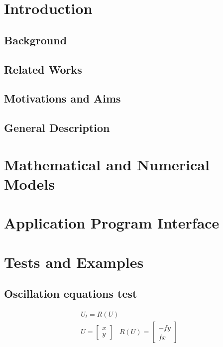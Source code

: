 \documentclass[pdftex,preprint,3p,times,numbers]{elsarticle}
\begin{document}
\section{Introduction}\label{sec:introduction}
\subsection{Background}

\subsection{Related Works}

\subsection{Motivations and Aims}

\subsection{General Description}

\section{Mathematical and Numerical Models}\label{sec:MNmodels}

\section{Application Program Interface}\label{sec:API}

\section{Tests and Examples}\label{sec:Tests}

\clearpage

\subsection{Oscillation equations test}

\begin{equation}
\begin{matrix}
U_t = R(U)  \\
U = \begin{bmatrix}
x \\
y
\end{bmatrix}\;\;\;
R(U) = \begin{bmatrix}
-f y \\
f x
\end{bmatrix}
\end{matrix}
\label{eq:oscillation}
\end{equation}
\end{document}
